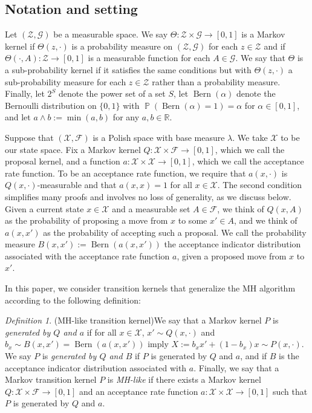 \documentclass[aihp]{imsart}
\theoremstyle{plain}
\theoremstyle{remark}
\newtheorem{definition}[theorem]{Definition}
\theoremstyle{definition} \newtheorem{example}{Example}
\newcommand{\R}{\ensuremath{\mathbb{R}}}
\renewcommand{\P}{\operatorname{\mathbb{P}}}
\newcommand{\Bern}{\operatorname{Bern}}
\newcommand{\scrF}{\mathscr{F}}
\newcommand{\scrG}{\mathscr{G}}
\newcommand{\calX}{\mathcal{X}}
\newcommand{\calZ}{\mathcal{Z}}
\newcommand{\cd}{\cdot}
\begin{document}
\subsection{Notation and setting}
\label{sec:notation}

Let $(\calZ, \scrG)$ be a measurable space. We say $\Theta: \calZ \times \scrG \to [0, 1]$ is a
Markov kernel if $\Theta(z, \cdot)$ is a probability measure on $(\calZ, \scrG)$ for each $z \in
\calZ$ and if $\Theta(\cdot, A) : \calZ \to [0,1]$ is a measurable function for each $A \in \scrG$.
We say that $\Theta$ is a sub-probability kernel if it satisfies the same conditions but with
$\Theta(z,\cdot)$ a sub-probability measure for each $z \in \calZ$ rather than a probability
measure. Finally, let $2^S$ denote the power set of a set $S$, let $\Bern(\alpha)$ denote the
Bernoulli distribution on $\{0,1\}$ with $\P(\Bern(\alpha)=1) = \alpha$ for $\alpha \in [0,1]$, and
let $a \wedge b := \min(a,b)$ for any $a,b \in \R$.

Suppose that $(\calX, \scrF)$ is a Polish space with base measure $\lambda$. We take $\calX$ to be
our state space. Fix a Markov kernel ${Q: \calX \times \scrF \to [0,1]}$, which we call the proposal
kernel, and a function $a: \calX \times \calX \to [0,1]$, which we call the acceptance rate
function. To be an acceptance rate function, we require that $a(x,\cd)$ is $Q(x,\cd)$-measurable and
that $a(x,x)=1$ for all $x \in \calX$. The second condition simplifies many proofs and involves no
loss of generality, as we discuss below. Given a current state $x \in \calX$ and a measurable set $A
\in \scrF$, we think of $Q(x, A)$ as the probability of proposing a move from $x$ to some $x' \in
A$, and we think of $a(x,x')$ as the probability of accepting such a proposal. We call the
probability measure ${ B(x,x') := \Bern(a(x,x')) }$ the acceptance indicator distribution associated
with the acceptance rate function $a$, given a proposed move from $x$ to $x'$.

In this paper, we consider transition kernels that generalize the MH algorithm according to the
following definition:

\smallskip

\begin{definition}(MH-like transition kernel)\label{def:mh-like}
We say that a Markov kernel $P$ is \textit{generated by $Q$ and $a$} if for all $x \in \calX$, $x'
\sim Q(x,\cdot)$ and $b_x \sim B(x,x') = \Bern(a(x,x'))$ imply $X := b_x x' + (1 - b_x) x \sim
P(x,\cdot)$. We say $P$ is \textit{generated by $Q$ and $B$} if $P$ is generated by $Q$ and $a$, and
if $B$ is the acceptance indicator distribution associated with $a$. Finally, we say that a Markov
transition kernel $P$ is \textit{MH-like} if there exists a Markov kernel $Q: \calX \times \scrF \to
[0,1]$ and an acceptance rate function $a: \calX \times \calX \to [0,1]$ such that $P$ is generated
by $Q$ and $a$.
\end{definition}
\end{document}

